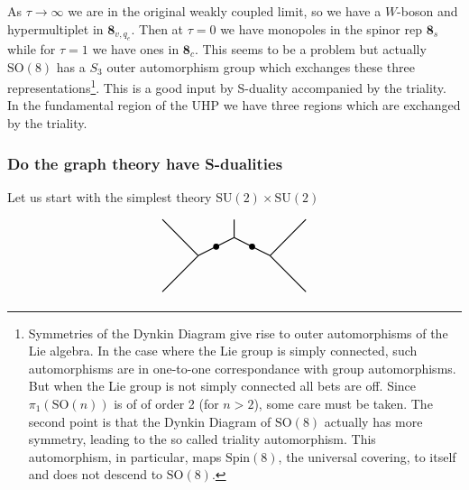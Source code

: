 \documentclass[11pt]{article}
\theoremstyle{definition}
\numberwithin{equation}{section}
\newcommand*\SU{\mathrm{SU}}
\newcommand*\SO{\mathrm{SO}}
\begin{document}
As $\tau\rightarrow\infty$ we are in the original weakly coupled limit, so we have a $W$-boson and hypermultiplet in $\mathbf{8}_{v,q_{e}}$. Then at $\tau=0$ we have monopoles in the spinor rep $\mathbf{8}_{s}$ while for $\tau=1$ we have ones in $\mathbf{8}_{c}$. This seems to be a problem but actually $\SO(8)$ has a $S_{3}$ outer automorphism group which exchanges these three representations\footnote{Symmetries of the Dynkin Diagram give rise to outer automorphisms of the Lie algebra. In the case where the Lie group is simply connected, such automorphisms are in one-to-one correspondance with group automorphisms. But when the Lie group is not simply connected all bets are off. Since $\pi_{1}(\SO(n))$ is of of order 2 (for $n>2$), some care must be taken. The second point is that the Dynkin Diagram of $\SO(8)$ actually has more symmetry, leading to the so called triality automorphism. This automorphism, in particular, maps $\text{Spin}(8)$, the universal covering, to itself and does not descend to $\SO(8)$.}. This is a good input by S-duality accompanied by the triality. In the fundamental region of the UHP we have three regions which are exchanged by the triality.

\subsubsection{Do the graph theory have S-dualities}
Let us start with the simplest theory $\SU(2)\times\SU(2)$

\begin{equation}
\begin{tikzpicture}[thick]
  \draw[-](0,0)--(1,-1);
  \draw[-](1,-1)--(0,-2);
  \draw[-](1,-1)--(2,-0.5);
  \draw[-](2,-0.5)--(2,0);
  \draw[-](2,-0.5)--(3,-1);
  \draw[-](3,-1)--(4,-2);
  \draw[-](3,-1)--(4,0);
  \filldraw[black] (1.5,-0.75) circle (2pt) node[]{};
  \filldraw[black] (2.5,-0.75) circle (2pt) node[]{};
\end{tikzpicture}
\end{equation}
\end{document}
